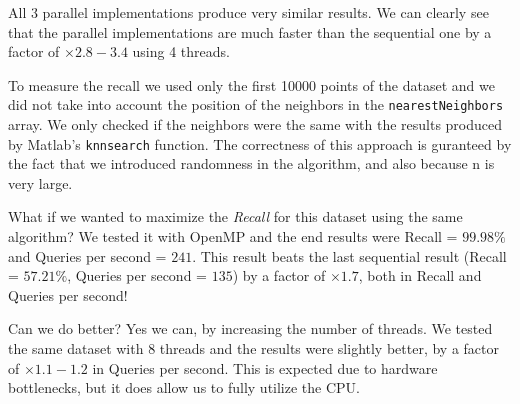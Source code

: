 \documentclass{article}
\begin{document}
All 3 parallel implementations produce very similar results. 
We can clearly see that the parallel implementations are much faster than the sequential one
by a factor of $\times2.8-3.4$ using 4 threads.

To measure the recall we used only the first 10000 points of the dataset and we did not take into account
the position of the neighbors in the \texttt{nearestNeighbors} array. We only checked if the neighbors were the same
with the results produced by Matlab's \texttt{knnsearch} function. The correctness of this approach is guranteed
by the fact that we introduced randomness in the algorithm, and also because n is very large.

What if we wanted to maximize the \emph{Recall} for this dataset using the same algorithm?
We tested it with OpenMP and the end results were Recall = $99.98\%$ and Queries per second = $241$.
This result beats the last sequential result (Recall = $57.21\%$, Queries per second = $135$) by a factor of $\times1.7$, 
both in Recall and Queries per second!

Can we do better? Yes we can, by increasing the number of threads. We tested the same dataset with 8 threads and the
results were slightly better, by a factor of $\times1.1-1.2$ in Queries per second. This is expected due to hardware
bottlenecks, but it does allow us to fully utilize the CPU.
\end{document}
